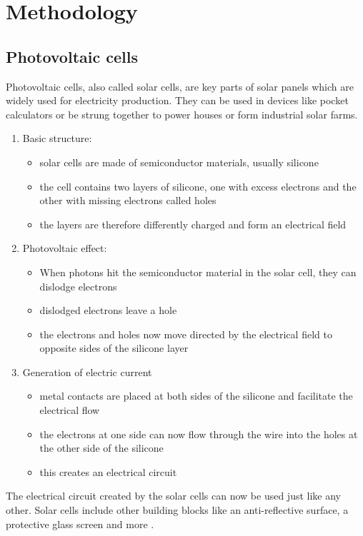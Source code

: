 \documentclass{article}
\begin{document}
\section{Methodology}
\subsection{Photovoltaic cells}\label{sec:pv}

Photovoltaic cells, also called solar cells, are key parts of solar panels which are widely used for electricity production. They can be used in devices like pocket calculators or be strung together to power houses or form industrial solar farms.\\

\begin{enumerate}
	\item Basic structure: \begin{itemize}
			\item solar cells are made of semiconductor materials, usually silicone
			\item the cell contains two layers of silicone, one with excess electrons and the other with missing electrons called holes
			\item the layers are therefore differently charged and form an electrical field
	\end{itemize}
	\item Photovoltaic effect: \begin{itemize}
		\item When photons hit the semiconductor material in the solar cell, they can dislodge electrons
		\item dislodged electrons leave a hole
		\item the electrons and holes now move directed by the electrical field to opposite sides of the silicone layer
	\end{itemize}
	\item Generation of electric current \begin{itemize}
		\item metal contacts are placed at both sides of the silicone and facilitate the electrical flow
		\item the electrons at one side can now flow through the wire into the holes at the other side of the silicone
		\item this creates an electrical circuit
	\end{itemize}
\end{enumerate}
The electrical circuit created by the solar cells can now be used just like any other. Solar cells include other building blocks like an anti-reflective surface, a protective glass screen and more \citep{SolarCells}.
\end{document}
